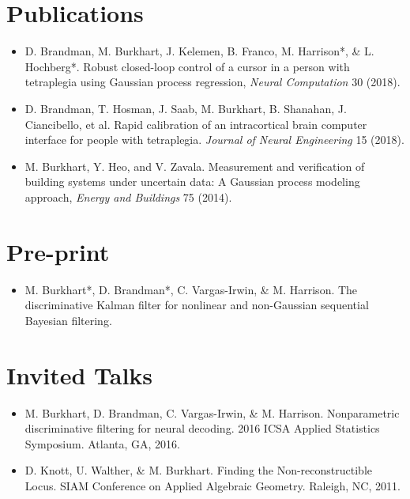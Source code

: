 \section*{Publications}
\begin{itemize}
    \item D. Brandman, M. Burkhart, J. Kelemen, B. Franco, M. Harrison*, \& L. Hochberg*. Robust closed-loop control of a cursor in a person with tetraplegia using Gaussian process regression,  \emph{Neural Computation} 30 (2018).
    \item D. Brandman, T. Hosman, J. Saab, M. Burkhart, B. Shanahan, J. Ciancibello, et al. Rapid calibration of an intracortical brain computer interface for people with tetraplegia. \emph{Journal of Neural Engineering} 15 (2018).
    \item M. Burkhart, Y. Heo, and V. Zavala. Measurement and verification of building systems under uncertain data: A Gaussian process modeling approach, \emph{Energy and Buildings} 75 (2014).
\end{itemize}


\section*{Pre-print}
\begin{itemize}
    \item M. Burkhart*, D. Brandman*, C. Vargas-Irwin, \& M. Harrison. The discriminative Kalman filter for nonlinear and non-Gaussian sequential Bayesian filtering.
\end{itemize}

\section*{Invited Talks}
\begin{itemize}
    \item M. Burkhart, D. Brandman, C. Vargas-Irwin, \& M. Harrison. Nonparametric discriminative filtering for neural decoding. 2016 ICSA Applied Statistics Symposium. Atlanta, GA, 2016.
    \item D. Knott, U. Walther, \& M. Burkhart. Finding the Non-reconstructible Locus. SIAM Conference on Applied Algebraic Geometry. Raleigh, NC, 2011.
\end{itemize}

